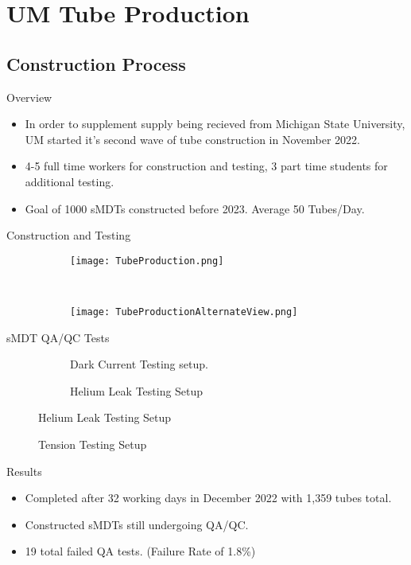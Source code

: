 \section{UM Tube Production}
	\subsection{Construction Process}
		\begin{frame}{Overview}
			\begin{itemize}
				\item In order to supplement supply being recieved from Michigan State University, UM started it's second wave of tube construction in November 2022.
				\item 4-5 full time workers for construction and testing, 3 part time students for additional testing. 
				\item Goal of 1000 sMDTs constructed before 2023. Average 50 Tubes/Day. 
			\end{itemize}
		\end{frame}
		\begin{frame}{Construction and Testing}
			\begin{figure}
				\centering
				\begin{subfigure}[c]{0.4\pdfpagewidth}
					\centering
					\texttt{[image: TubeProduction.png]}
				\end{subfigure}
				~
				\begin{subfigure}[c]{0.4\pdfpagewidth}
					\centering
					\texttt{[image: TubeProductionAlternateView.png]}
				\end{subfigure}
			\end{figure}
		\end{frame}
		\begin{frame}{sMDT QA/QC Tests}
			\begin{figure}
				\begin{subfigure}[c]{0.4\pdfpagewidth}
					\centering
					\caption{Dark Current Testing setup.}
				\end{subfigure}
				\begin{subfigure}[c]{0.4\pdfpagewidth}
					\centering
					\caption{Helium Leak Testing Setup}
				\end{subfigure}
			\end{figure}

			\begin{figure}
				\centering
				\caption{Tension Testing Setup}
			\end{figure}
		\end{frame}
		\begin{frame}{Results}
			\begin{itemize}
				\item Completed after 32 working days in December 2022 with 1,359 tubes total. 
				\item Constructed sMDTs still undergoing QA/QC. 
				\item 19 total failed QA tests. (Failure Rate of 1.8\%)
			\end{itemize}
		\end{frame}



